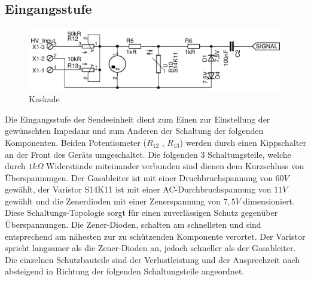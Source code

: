\subsection{Eingangsstufe}
\begin{figure}[H]
\centering
 \includegraphics[scale=0.55]{gfx/eingangstufe.pdf}
 \caption{Kaskade}
	\label{kaskade} 
\end{figure}
Die Eingangsstufe der Sendeeinheit dient zum Einen zur Einstellung der gewünschten Impedanz und zum Anderen der Schaltung der folgenden Komponenten.
Beiden Potentiometer ($R_{12}$ , $R_{13}$) werden durch einen Kippschalter an der Front des Geräts umgeschaltet. Die folgenden 3 Schaltungsteile, welche durch $1k\Omega$ Widerstände miteinander verbunden sind dienen dem Kurzschluss von Überspannungen. Der Gasableiter ist mit einer Druchbruchspannung von $60V$ gewählt, der Varistor S14K11 ist mit einer AC-Durchbruchspannung von $11V$ gewählt und die Zenerdioden mit einer Zenerspannung von $7,5V$ dimensioniert.\\
Diese Schaltungs-Topologie sorgt für einen zuverlässigen Schutz gegenüber Überspannungen. Die Zener-Dioden, schalten am schnellsten und sind entsprechend am nähesten zur zu schützenden Komponente verortet. Der Varistor spricht langsamer als die Zener-Dioden an, jedoch schneller als der Gasableiter. Die einzelnen Schutzbauteile sind der Verlustleistung und der Ansprechzeit nach absteigend in Richtung der folgenden Schaltungsteile angeordnet.
